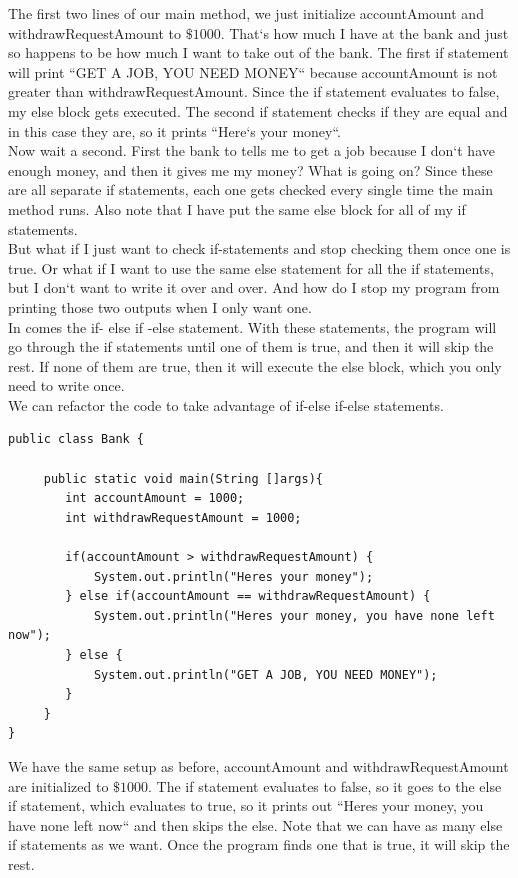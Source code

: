 \documentclass[11]{article}
\begin{document}
The first two lines of our main method, we just initialize accountAmount and withdrawRequestAmount to $\$1000$. That`s how much I have at the bank and just so happens to be how much I want to take out of the bank. The first if statement will print ``GET A JOB, YOU NEED MONEY`` because accountAmount is not greater than withdrawRequestAmount. Since the if statement evaluates to false, my else block gets executed. The second if statement checks if they are equal and in this case they are, so it prints ``Here`s your money``.  \\

Now wait a second. First the bank to tells me to get a job because I don`t have enough money, and then it gives me my money? What is going on? Since these are all separate if statements, each one gets checked every single time the main method runs. Also note that I have put the same else block for all of my if statements.\\

But what if I just want to check if-statements and stop checking them once one is true. Or what if I want to use the same else statement for all the if statements, but I don`t want to write it over and over. And how do I stop my program from printing those two outputs when I only want one.\\

In comes the if- else if -else statement. With these statements, the program will go through the if statements until one of them is true, and then it will skip the rest. If none of them are true, then it will execute the else block, which you only need to write once.\\

We can refactor the code to take advantage of if-else if-else statements.
\begin{lstlisting}
public class Bank {

     public static void main(String []args){
        int accountAmount = 1000;
        int withdrawRequestAmount = 1000;
        
        if(accountAmount > withdrawRequestAmount) {
            System.out.println("Heres your money");
        } else if(accountAmount == withdrawRequestAmount) {
            System.out.println("Heres your money, you have none left now");
        } else {
            System.out.println("GET A JOB, YOU NEED MONEY");
        }
     }
}
\end{lstlisting}
We have the same setup as before, accountAmount and withdrawRequestAmount are initialized to $\$1000$.
The if statement evaluates to false, so it goes to the else if statement, which evaluates to true, so it prints out ``Heres your money, you have none left now`` and then skips the else. Note that we can have as many else if statements as we want. Once the program finds one that is true, it will skip the rest.
\end{document}
